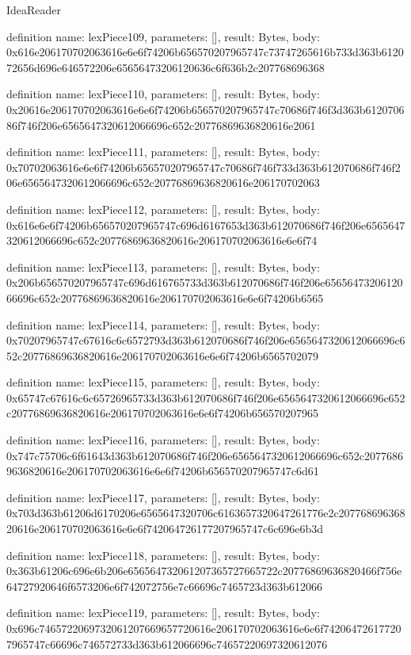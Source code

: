 \begin{lexlean}{IdeaReader}
\begin{semanticmodule}
definition{
  name: lexPiece109,
  parameters: [],
  result: Bytes,
  body: 0x616e206170702063616e6e6f74206b656570207965747c73747265616b733d363b612072656d696e646572206e65656473206120636c6f636b2c207768696368
}

definition{
  name: lexPiece110,
  parameters: [],
  result: Bytes,
  body: 0x20616e206170702063616e6e6f74206b656570207965747c70686f746f3d363b612070686f746f206e6565647320612066696c652c20776869636820616e2061
}

definition{
  name: lexPiece111,
  parameters: [],
  result: Bytes,
  body: 0x70702063616e6e6f74206b656570207965747c70686f746f733d363b612070686f746f206e6565647320612066696c652c20776869636820616e206170702063
}

definition{
  name: lexPiece112,
  parameters: [],
  result: Bytes,
  body: 0x616e6e6f74206b656570207965747c696d6167653d363b612070686f746f206e6565647320612066696c652c20776869636820616e206170702063616e6e6f74
}

definition{
  name: lexPiece113,
  parameters: [],
  result: Bytes,
  body: 0x206b656570207965747c696d616765733d363b612070686f746f206e6565647320612066696c652c20776869636820616e206170702063616e6e6f74206b6565
}

definition{
  name: lexPiece114,
  parameters: [],
  result: Bytes,
  body: 0x70207965747c67616c6c6572793d363b612070686f746f206e6565647320612066696c652c20776869636820616e206170702063616e6e6f74206b6565702079
}

definition{
  name: lexPiece115,
  parameters: [],
  result: Bytes,
  body: 0x65747c67616c6c65726965733d363b612070686f746f206e6565647320612066696c652c20776869636820616e206170702063616e6e6f74206b656570207965
}

definition{
  name: lexPiece116,
  parameters: [],
  result: Bytes,
  body: 0x747c75706c6f61643d363b612070686f746f206e6565647320612066696c652c20776869636820616e206170702063616e6e6f74206b656570207965747c6d61
}

definition{
  name: lexPiece117,
  parameters: [],
  result: Bytes,
  body: 0x703d363b61206d6170206e6565647320706c6163657320647261776e2c20776869636820616e206170702063616e6e6f742064726177207965747c6c696e6b3d
}

definition{
  name: lexPiece118,
  parameters: [],
  result: Bytes,
  body: 0x363b61206c696e6b206e656564732061207365727665722c20776869636820466f756e64727920646f6573206e6f742072756e7c66696c7465723d363b612066
}

definition{
  name: lexPiece119,
  parameters: [],
  result: Bytes,
  body: 0x696c7465722069732061207669657720616e206170702063616e6e6f742064726177207965747c66696c746572733d363b612066696c74657220697320612076
}


\end{semanticmodule}
\end{lexlean}
